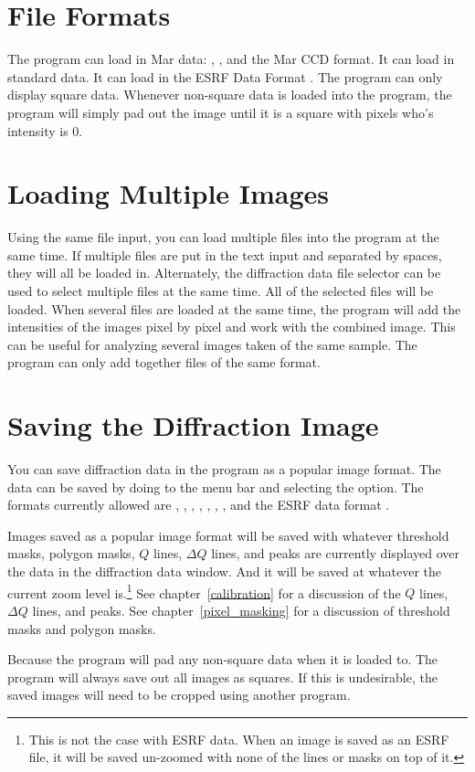 \section{File Formats}

The program can load in Mar data: , 
, and the  Mar CCD format.
It can load in standard  data. 
It can load in the ESRF Data Format .
The program can only display square data. Whenever non-square
data is loaded into the program, the program will simply pad 
out the image until it is a square with pixels who's intensity is 0. 

\section{Loading Multiple Images}

Using the same file input, you can load multiple files into 
the program at the same time. If multiple files are put in 
the  text input  and separated by spaces, they
will all be loaded in. Alternately, the diffraction data file 
selector can be used to select multiple files at the same time.
All of the selected files will be loaded.
When several files are loaded at the same time, the program will 
add the intensities of the images pixel by pixel and work with the 
combined image.  This can be useful for analyzing several images 
taken of the same sample. The program can only add together files 
of the same format.

\section{Saving the Diffraction Image}

You can save diffraction data in the program as a popular image format. 
The data can be saved by doing to the  menu bar and selecting 
the  option.  The formats currently allowed are , 
, , , , , , and 
the ESRF data format .

Images saved as a popular image format will be saved with whatever
threshold masks, polygon masks, $Q$ lines, $\Delta Q$ lines, and peaks 
are currently displayed over the data in the diffraction data 
window. And it will be saved at whatever the current zoom level 
is.\footnote{This is not the case with ESRF data. When an image
is saved as an ESRF file, it will be saved un-zoomed with none
of the lines or masks on top of it.} See chapter~\ref{calibration} for 
a discussion of the $Q$ lines, $\Delta Q$ lines, and peaks. See 
chapter~\ref{pixel_masking} for a discussion of threshold masks and 
polygon masks.

Because the program will pad any non-square data when
it is loaded to. The program will always save out 
all images as squares. If this is undesirable, the saved images
will need to be cropped using another program.

